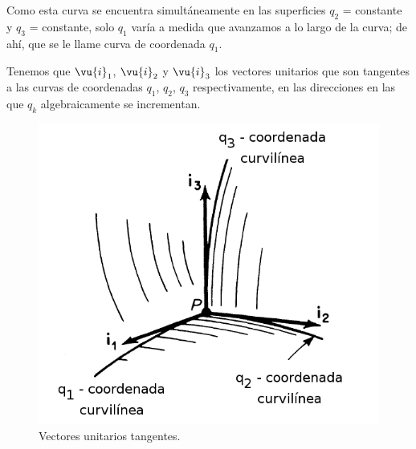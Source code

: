\par
Como esta curva se encuentra simultáneamente en las superficies $q_{2}$ = constante y $q_{3}$ = constante, solo $q_{1}$ varía a medida que avanzamos a lo largo de la curva; de ahí, que se le llame curva de coordenada $q_{1}$.
\par
Tenemos que $\vu{i}_{1}$, $\vu{i}_{2}$ y $\vu{i}_{3}$ los vectores unitarios que son tangentes a las curvas de coordenadas $q_{1}$, $q_{2}$, $q_{3}$ respectivamente, en las direcciones en las que $q_{k}$ algebraicamente se incrementan.
\begin{figure}[H]
    \centering
    \includegraphics[scale=0.4]{Imagenes/CoordenadasCurvilineas_02.png}
    \caption{Vectores unitarios tangentes.}
\end{figure}
